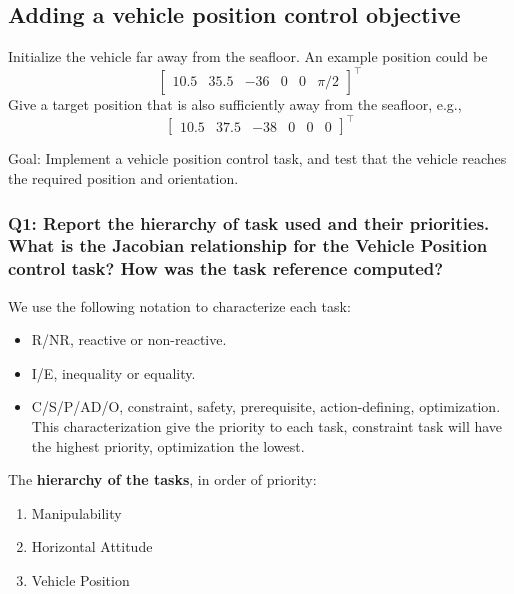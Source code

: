 \documentclass{article}
\begin{document}
\subsection{Adding a vehicle position control objective}
Initialize the vehicle far away from the seafloor. An example position could be
\begin{displaymath}
\begin{bmatrix} 10.5 & 35.5 & -36 & 0 & 0 & \pi/2\end{bmatrix}^\top
\end{displaymath} 
Give a target position that is also sufficiently away from the seafloor, e.g.,
\begin{displaymath}
\begin{bmatrix} 10.5 & 37.5 & -38 & 0 & 0 & 0 \end{bmatrix}^\top
\end{displaymath}

Goal: Implement a vehicle position control task, and test that the vehicle reaches the required position and orientation.



\subsubsection{Q1: Report the hierarchy of task used and their priorities. What is the Jacobian relationship for the Vehicle Position control task? How was the task reference computed?}

We use the following notation to characterize each task:
\begin{itemize}
    \item R/NR, reactive or non-reactive.
    \item I/E, inequality or equality.
    \item C/S/P/AD/O, constraint, safety, prerequisite, action-defining, optimization. This characterization give the priority to each task, constraint task will have the highest priority, optimization the lowest.
\end{itemize}

\noindent
\vspace{5px}
The \textbf{hierarchy of the tasks}, in order of priority:
\begin{enumerate}
    \item Manipulability 
    \item Horizontal Attitude
    \item Vehicle Position
\end{enumerate}
\end{document}
